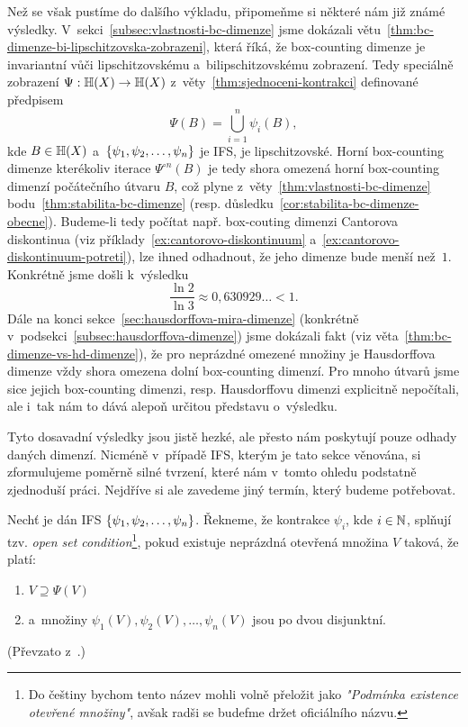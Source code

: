Než se však pustíme do dalšího výkladu, připomeňme si některé nám již známé výsledky. V~sekci~\ref{subsec:vlastnosti-bc-dimenze} jsme dokázali větu~\ref{thm:bc-dimenze-bi-lipschitzovska-zobrazeni}, která říká, že box-counting dimenze je invariantní vůči lipschitzovskému a~bilipschitzovskému zobrazení. Tedy speciálně zobrazení $\Psi:\mathbb{H}(X) \rightarrow \mathbb{H}(X)$ z~věty~\ref{thm:sjednoceni-kontrakci} definované předpisem
\[\Psi(B)=\bigcup_{i=1}^n\psi_i(B),\]
kde $B\in\mathbb{H}(X)$ a~$\left\{\psi_1,\psi_2,\ldots,\psi_n\right\}$ je IFS, je lipschitzovské. Horní box-counting dimenze kterékoliv iterace $\Psi^{\circ n}(B)$ je tedy shora omezená horní box-counting dimenzí počátečního útvaru $B$, což plyne z~věty~\ref{thm:vlastnosti-bc-dimenze} bodu~\ref{thm:stabilita-bc-dimenze} (resp. důsledku~\ref{cor:stabilita-bc-dimenze-obecne}). Budeme-li tedy počítat např. box-couting dimenzi Cantorova diskontinua (viz příklady~\ref{ex:cantorovo-diskontinuum} a~\ref{ex:cantorovo-diskontinuum-potreti}), lze ihned odhadnout, že jeho dimenze bude menší než~$1$. Konkrétně jsme došli k~výsledku
\[\dfrac{\ln{2}}{\ln{3}}\approx0{,}630929\ldots<1.\]
Dále na konci sekce~\ref{sec:hausdorffova-mira-dimenze} (konkrétně v~podsekci~\ref{subsec:hausdorffova-dimenze}) jsme dokázali fakt (viz věta~\ref{thm:bc-dimenze-vs-hd-dimenze}), že pro neprázdné omezené množiny je Hausdorffova dimenze vždy shora omezena dolní box-counting dimenzí. Pro mnoho útvarů jsme sice jejich box-counting dimenzi, resp. Hausdorffovu dimenzi explicitně nepočítali, ale i~tak nám to dává alepoň určitou představu o~výsledku.

Tyto dosavadní výsledky jsou jistě hezké, ale přesto nám poskytují pouze odhady daných dimenzí. Nicméně v~případě IFS, kterým je tato sekce věnována, si zformulujeme poměrně silné tvrzení, které nám v~tomto ohledu podstatně zjednoduší práci. Nejdříve si ale zavedeme jiný termín, který budeme potřebovat.
\begin{definition}\label{def:open-set-condition}
    Nechť je dán IFS $\left\{\psi_1,\psi_2,\ldots,\psi_n\right\}$. Řekneme, že kontrakce $\psi_i$, kde $i\in\mathbb{N}$, splňují tzv. \emph{open set condition}\footnote{Do češtiny bychom tento název mohli volně přeložit jako \emph{"Podmínka existence otevřené množiny"}, avšak radši se budefme držet oficiálního názvu.}, pokud existuje neprázdná otevřená množina $V$ taková, že platí:
    \begin{enumerate}[label=(\alph*)]
        \item $V\supseteq\Psi(V)$
        \item a~množiny $\psi_1(V),\psi_2(V),\ldots,\psi_n(V)$ jsou po dvou disjunktní.
    \end{enumerate}
\end{definition}
(Převzato z~\citep[str. 139]{Falconer1989}.)

